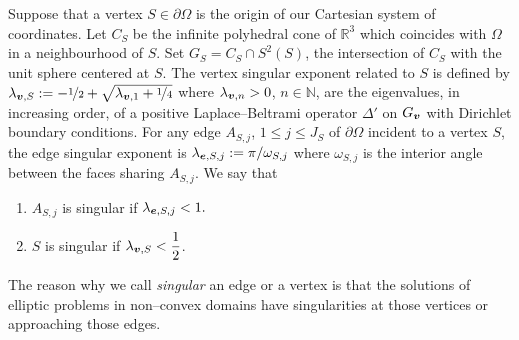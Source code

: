 \begin{defi}
Suppose that a vertex
$S\in\partial\Omega$ is the origin of our Cartesian system of coordinates. Let $C_{S}$ be the infinite
polyhedral cone of $\mathbb{R}^3$ which coincides with $\Omega$ in a neighbourhood of 
$S$. Set $G_{S} = C_{S}\cap S^2(S)$, the intersection of $C_{S}$ with
the unit sphere centered at $S$. The vertex singular exponent related to $S$
is defined by $\lambda_{\boldsymbol{v},S} := -\nicefrac12 + \sqrt{\lambda_{\boldsymbol{v},1} + \nicefrac14}$
where 
$\lambda_{\boldsymbol{v},n} > 0$, $n\in\mathbb{N}$, are the eigenvalues, in increasing order, of a positive
Laplace--Beltrami operator $\Delta'$ on $G_{\boldsymbol{v}}$ with Dirichlet boundary
conditions. For any edge $A_{S,j}$, $1\leqslant j\leqslant J_S$
of $\partial\Omega$ incident to a vertex $S$, the edge
singular exponent is 
$\lambda_{\boldsymbol{e},S,j} := \pi/\omega_{S,j}$ where $\omega_{S,j}$ is the interior angle between
the faces sharing  $A_{S,j}$.
We say that
  \begin{enumerate}
    \item $A_{S,j}$ is singular if $\lambda_{\boldsymbol{e},S,j} < 1.$ 
    \item $S$ is singular if $\lambda_{\boldsymbol{v},S} < \dfrac12$.
  \end{enumerate}
\end{defi}
The reason why we call \textsl{singular} an edge or a vertex is that
the solutions of elliptic problems in non--convex domains have singularities
at those vertices or approaching those edges.
